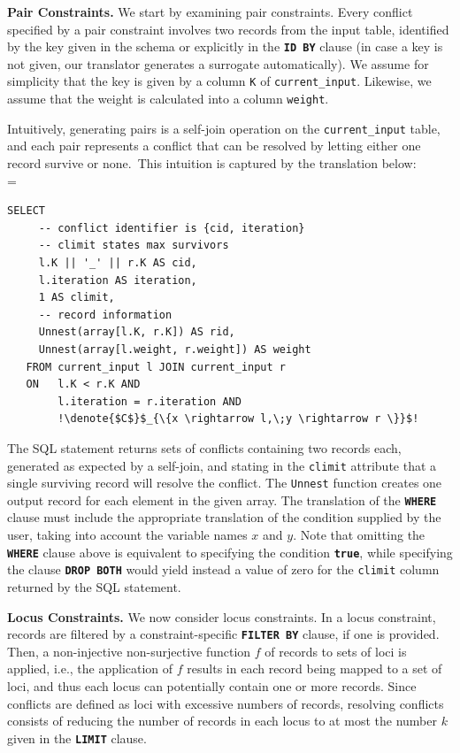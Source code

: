 \documentclass[11pt, oneside]{report}
\newcommand{\minisec}[1]{\noindent\textbf{#1.}}
\newcommand{\denote}[1]{\text{$[\![ $#1$ ]\!]$}}
\begin{document}
{\minisec{Pair Constraints}
We start by examining pair constraints. Every conflict specified by a pair constraint involves two records from the input table, identified by the key given in the schema or explicitly in the \textbf{\texttt{ID BY}} clause (in case a key is not given, our translator generates a surrogate automatically). We assume for simplicity that the key is given by a column \texttt{K} of \texttt{current\_input}. Likewise, we assume that the weight is calculated into a column \texttt{weight}.  

Intuitively, generating pairs is a self-join operation on the \texttt{current\_input} table, and each pair represents a conflict that can be resolved by letting either one record survive or none.~This intuition is captured by the translation below: \\

\denote{\lstinline!FOREACH PAIR!$\;x,\;y\;$\lstinline!WHERE!$\;C\;$\lstinline!DROP ONE!} =
\begin{lstlisting}[mathescape,escapechar=!]
   SELECT
     -- conflict identifier is {cid, iteration}
     -- climit states max survivors
     l.K || '_' || r.K AS cid,
     l.iteration AS iteration,
     1 AS climit,
     -- record information
     Unnest(array[l.K, r.K]) AS rid,
     Unnest(array[l.weight, r.weight]) AS weight
   FROM current_input l JOIN current_input r
   ON   l.K < r.K AND
        l.iteration = r.iteration AND
        !\denote{$C$}$_{\{x \rightarrow l,\;y \rightarrow r \}}$!
\end{lstlisting}

The SQL statement returns sets of conflicts containing two records each, generated as expected by a self-join, and stating in the \texttt{climit} attribute that a single surviving record will resolve the conflict. The \texttt{Unnest} function creates one output record for each element in the given array. The translation of the \textbf{\texttt{WHERE}} clause must include the appropriate translation of the condition supplied by the user, taking into account the variable names $x$ and $y$. Note that omitting the \textbf{\texttt{WHERE}} clause above is equivalent to specifying the condition \textbf{\texttt{true}}, while specifying the clause \textbf{\texttt{DROP BOTH}} would yield instead a value of zero for the \texttt{climit} column returned by the SQL statement.
 
\minisec{Locus Constraints}
We now consider locus constraints. In a locus constraint, records are filtered by a constraint-specific \textbf{\texttt{FILTER BY}} clause, if one is provided. Then, a non-injective non-surjective function $f$ of records to sets of loci is applied, i.e., the application of $f$ results in each record being mapped to a set of loci, and thus each locus can potentially contain one or more records. Since conflicts are defined as loci with excessive numbers of records, resolving conflicts consists of reducing the number of records in each locus to at most the number $k$ given in the \textbf{\texttt{LIMIT}} clause. \\

}
\end{document}
